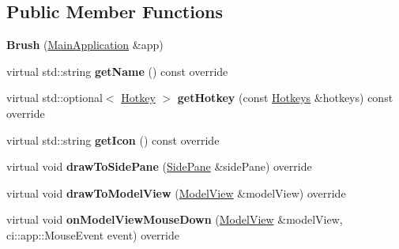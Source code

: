 \subsection*{Public Member Functions}
\begin{DoxyCompactItemize}
\item 
\mbox{\label{classpepr3d_1_1_brush_a2407e6159f4d5798f62763bf53190419}} 
{\bfseries Brush} (\mbox{\hyperlink{classpepr3d_1_1_main_application}{Main\+Application}} \&app)
\item 
\mbox{\label{classpepr3d_1_1_brush_a8a5bfb009a6c666bf0cfdd6afe55812a}} 
virtual std\+::string {\bfseries get\+Name} () const override
\item 
\mbox{\label{classpepr3d_1_1_brush_aabba5037acc73348535a471b1e8a4979}} 
virtual std\+::optional$<$ \mbox{\hyperlink{structpepr3d_1_1_hotkey}{Hotkey}} $>$ {\bfseries get\+Hotkey} (const \mbox{\hyperlink{classpepr3d_1_1_hotkeys}{Hotkeys}} \&hotkeys) const override
\item 
\mbox{\label{classpepr3d_1_1_brush_a19ed1135e2c4cc603f001c6af4b2f58f}} 
virtual std\+::string {\bfseries get\+Icon} () const override
\item 
\mbox{\label{classpepr3d_1_1_brush_a0f0e98b2326e88fa5b6a3cbeaeb9b3b1}} 
virtual void {\bfseries draw\+To\+Side\+Pane} (\mbox{\hyperlink{classpepr3d_1_1_side_pane}{Side\+Pane}} \&side\+Pane) override
\item 
\mbox{\label{classpepr3d_1_1_brush_a88cb183b963bd9e4e5082fcbe50bdcd1}} 
virtual void {\bfseries draw\+To\+Model\+View} (\mbox{\hyperlink{classpepr3d_1_1_model_view}{Model\+View}} \&model\+View) override
\item 
\mbox{\label{classpepr3d_1_1_brush_a9222fa4ba78b38f7b37767dfe8d26b67}} 
virtual void {\bfseries on\+Model\+View\+Mouse\+Down} (\mbox{\hyperlink{classpepr3d_1_1_model_view}{Model\+View}} \&model\+View, ci\+::app\+::\+Mouse\+Event event) override
\item 
\mbox{\label{classpepr3d_1_1_brush_acf9efe6c3b3b8bed2ed8b06c68f5f0f9}} 

\end{DoxyCompactItemize}
